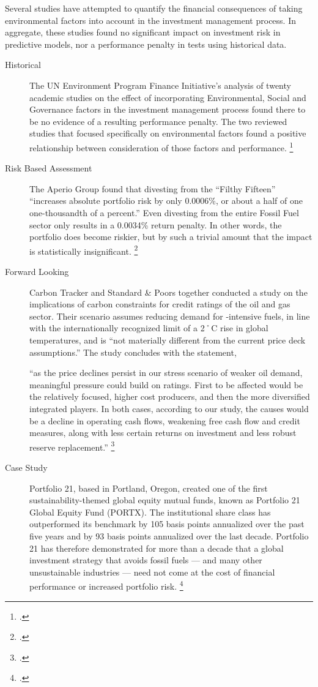 Several studies have attempted to quantify the financial consequences of taking environmental factors into account in the investment management process.
In aggregate, these studies found no significant impact on investment risk in predictive models, nor a performance penalty in tests using historical data.
\begin{description}
  \item[Historical] The UN Environment Program Finance Initiative's analysis of twenty academic studies on the effect of incorporating Environmental, Social and Governance factors in the investment management process found there to be no evidence of a resulting performance penalty.  The two reviewed studies that focused specifically on environmental factors found a positive relationship between consideration of those factors and performance. \footcite{UNEPFI2007}
  \item[Risk Based Assessment] The Aperio Group found that divesting from the ``Filthy Fifteen'' ``increases absolute portfolio risk by only 0.0006\%, or about a half of one one-thousandth of a percent.'' Even divesting from the entire Fossil Fuel sector only results in a 0.0034\% return penalty. In other words, the portfolio does become riskier, but by such a trivial amount that the impact is statistically insignificant. \footcite{Aperio2013}
  \item[Forward Looking] Carbon Tracker and Standard \& Poors together conducted a study on the implications of carbon constraints for credit ratings of the oil and gas sector. Their scenario assumes reducing demand for -intensive fuels, in line with the internationally recognized limit of a 2˚C rise in global temperatures, and is ``not materially different from the current price deck assumptions.'' The study concludes with the statement,
  \begin{slquote} ``as the price declines persist in our stress scenario of weaker oil demand, meaningful pressure could build on ratings. First to be affected would be the relatively focused, higher cost producers, and then the more diversified integrated players. In both cases, according to our study, the causes would be a decline in operating cash flows, weakening free cash flow and credit measures, along with less certain returns on investment and less robust reserve replacement.'' \footcite{SandPConstrained}
  \end{slquote}
  \item[Case Study] Portfolio 21, based in Portland, Oregon, created one of the first sustainability-themed global equity mutual funds, known as Portfolio 21 Global Equity Fund (PORTX). The institutional share class has outperformed its benchmark by 105 basis points annualized over the past five years and by 93 basis points annualized over the last decade. Portfolio 21 has therefore demonstrated for more than a decade that a global investment strategy that avoids fossil fuels --- and many other unsustainable industries --- need not come at the cost of financial performance or increased portfolio risk. \footcite{FossilFreeInvesting}
\end{description}
